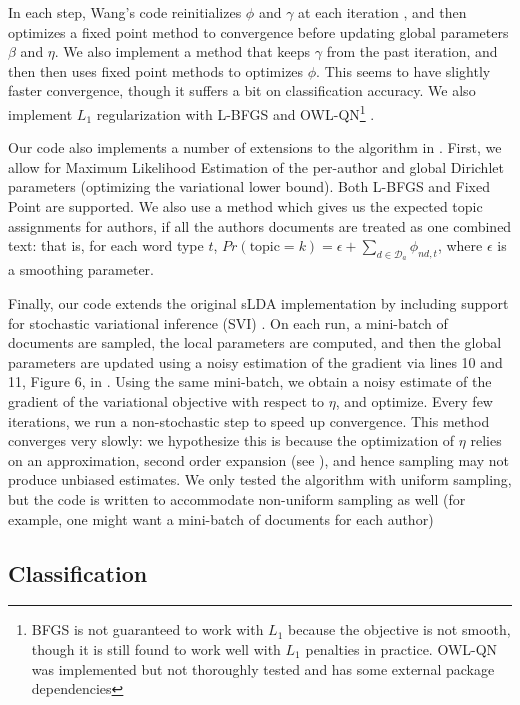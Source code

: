 \documentclass[14pt]{article} %
\theoremstyle{plain}
\theoremstyle{definition}
\theoremstyle{remark}
\begin{document}
\begin{appendix}
In each step, Wang's code reinitializes $\phi$ and $\gamma$ at each iteration \cite{wang2009simultaneous}, and then optimizes a fixed point method to convergence before updating global parameters $\beta$ and $\eta$. We also implement a method that keeps $\gamma$ from the past iteration, and then then uses fixed point methods to optimizes $\phi$. This seems to have slightly faster convergence, though it suffers a bit on classification accuracy. We also implement $L_1$ regularization with L-BFGS \cite{liu1989limited} and OWL-QN\footnote{BFGS is not guaranteed to work with $L_1$ because the objective is not smooth, though it is still found to work well with $L_1$ penalties in practice. OWL-QN was implemented but not thoroughly tested and has some external package dependencies} \cite{andrew2007scalable}.

Our code also implements a number of extensions to the algorithm in \cite{wang2009simultaneous}. First, we allow for Maximum Likelihood Estimation of the per-author and global Dirichlet parameters (optimizing the variational lower bound). Both L-BFGS and Fixed Point \cite{minka2000estimating} are supported. We also use a method which gives us the expected topic assignments for authors, if all the authors documents are treated as one combined text: that is, for each word type $t$, $Pr(\text{topic}=k) = \epsilon + \sum_{d\in \mathcal{D}_a}\phi_{nd,t}$, where $\epsilon$ is a smoothing parameter.

Finally, our code extends the original sLDA implementation by including support for stochastic variational inference (SVI) \cite{hoffman2013stochastic}. On each run, a mini-batch of documents are sampled, the local parameters are computed, and then the global parameters are updated using a noisy estimation of the gradient via lines 10 and 11, Figure 6, in  \cite{hoffman2013stochastic}. Using the same mini-batch, we obtain a noisy estimate of the gradient of the variational objective with respect to $\eta$, and optimize. Every few iterations, we run a non-stochastic step to speed up convergence. This method converges very slowly: we hypothesize this is because the optimization of $\eta$ relies on an approximation, second order expansion (see \cite{wang2009simultaneous}), and hence sampling may not produce unbiased estimates. We only tested the algorithm with uniform sampling, but the code is written to accommodate non-uniform sampling as well (for example, one might want a mini-batch of documents for each author)


\subsection{Classification}
\label{appendix:classification}


\end{appendix}
\end{document}

